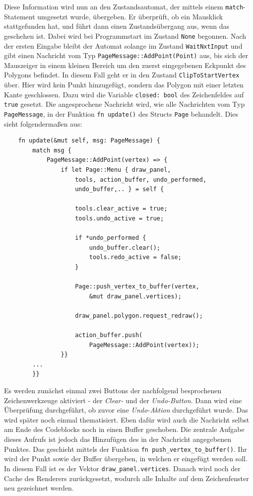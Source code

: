 Diese Information wird nun an den Zustandsautomat, der mittels einem \lstinline{match}-Statement umgesetzt wurde, übergeben. Er überprüft, ob ein Mausklick stattgefunden hat, und führt dann einen Zustandsübergang aus, wenn das geschehen ist.
Dabei wird bei Programmstart im Zustand \lstinline{None} begonnen. Nach der ersten Eingabe bleibt der Automat solange im Zustand \lstinline{WaitNxtInput} und gibt einen Nachricht vom Typ \lstinline{PageMessage::AddPoint(Point)} aus, bis sich der Mauszeiger in einem 
kleinen Bereich um den zuerst eingegebenen Eckpunkt des Polygons befindet. 
In diesem Fall geht er in den Zustand \lstinline{ClipToStartVertex} über. Hier wird kein Punkt hinzugefügt, sondern das Polygon mit einer letzten Kante geschlossen. Dazu wird die Variable \lstinline{closed: bool} des Zeichenfeldes auf \lstinline{true} 
gesetzt. 
Die angesprochene Nachricht wird, wie alle Nachrichten vom Typ \lstinline{PageMessage}, in der Funktion \lstinline{fn update()} des Structs \lstinline{Page} behandelt. Dies sieht folgendermaßen aus:

\begin{lstlisting}
    fn update(&mut self, msg: PageMessage) {
        match msg {
            PageMessage::AddPoint(vertex) => {
                if let Page::Menu { draw_panel, 
                    tools, action_buffer, undo_performed, 
                    undo_buffer,.. } = self {

                    tools.clear_active = true;
                    tools.undo_active = true;
                    
                    if *undo_performed {
                        undo_buffer.clear();
                        tools.redo_active = false;
                    }

                    Page::push_vertex_to_buffer(vertex, 
                        &mut draw_panel.vertices);            
                    
                    draw_panel.polygon.request_redraw();

                    action_buffer.push(
                        PageMessage::AddPoint(vertex));     
                }}
        ...
        }}
\end{lstlisting}
Es werden zunächst einmal zwei Buttons der nachfolgend besprochenen Zeichenwerkzeuge aktiviert - der \emph{Clear-} und der \emph{Undo-Button}. Dann wird eine Überprüfung durchgeführt, ob zuvor eine \emph{Undo-Aktion} 
durchgeführt wurde. Das wird später noch einmal thematisiert. Eben dafür wird auch die Nachricht selbst am Ende des Codeblocks noch in einen Buffer geschoben.
Die zentrale Aufgabe dieses Aufrufs ist jedoch das Hinzufügen des in der Nachricht angegebenen Punktes. Das geschieht mittels der Funktion \lstinline{fn push_vertex_to_buffer()}. Ihr wird 
der Punkt sowie der Buffer übergeben, in welchen er eingefügt werden soll. In diesem Fall ist es der Vektor \lstinline{draw_panel.vertices}. Danach wird noch der Cache des Renderers zurückgesetzt, wodurch alle Inhalte auf dem 
Zeichenfenster neu gezeichnet werden.\linebreak

